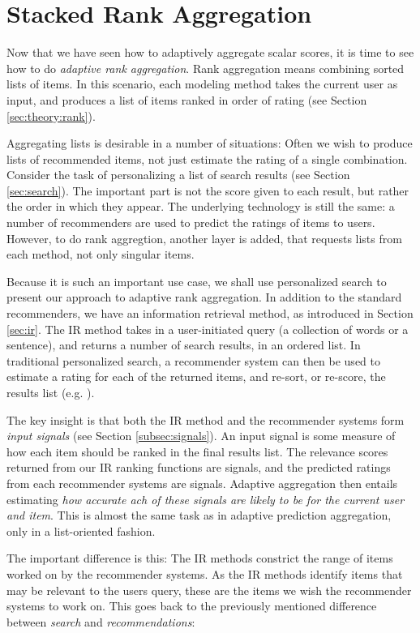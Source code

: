 \section{Stacked Rank Aggregation}
\label{sec:methods:rank}

Now that we have seen how to adaptively aggregate scalar scores, it is time to see how
to do \emph{adaptive rank aggregation}. Rank aggregation means combining sorted lists of items.
In this scenario, each modeling method takes the current user as input, and produces a
list of items ranked in order of rating
(see Section \ref{sec:theory:rank}).

Aggregating lists is desirable in a number of situations:
Often we wish to produce lists of recommended items, not just estimate the rating of a single combination.
Consider the task of personalizing a list of search results
(see Section \ref{sec:search}). The important part is not the score
given to each result, but rather the order in which they appear.
The underlying technology is still the same: a number of recommenders are used to predict the ratings
of items to users. However, to do rank aggregtion, another layer is added, that requests lists from each method,
not only singular items.

Because it is such an important use case, we shall use personalized search to present our approach to adaptive rank aggregation.
In addition to the standard recommenders, we have an information retrieval method,
as introduced in Section \ref{sec:ir}.
The IR method takes in a user-initiated query (a collection of words or a sentence), and returns a number of 
search results, in an ordered list.
In traditional personalized search, a recommender system can then be used to estimate a rating for each of the returned items,
and re-sort, or re-score, the results list (e.g. \citet[p3]{Xu2008}).

The key insight is that both the IR method and the recommender systems form \emph{input signals}
(see Section \ref{subsec:signals}).
An input signal is some measure of how each item should be ranked in the final results list.
The relevance scores returned from our IR ranking functions are signals,
and the predicted ratings from each recommender systems are signals.
Adaptive aggregation then entails estimating \emph{how accurate ach of these signals are likely to be for the current user and item}.
This is almost the same task as in adaptive prediction aggregation, only in a list-oriented fashion.

The important difference is this: The IR methods constrict the range of items worked on by the recommender systems.
As the IR methods identify items that may be relevant to the users query, these are the items we wish the recommender systems to work on.
This goes back to the previously mentioned difference between \emph{search} and \emph{recommendations}:

